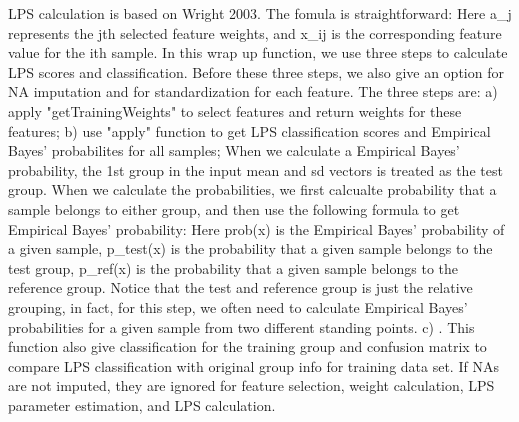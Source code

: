 \documentclass[letterpaper]{book}
\begin{document}
%
\begin{Details}\relax
LPS calculation is based on Wright 2003. The fomula is straightforward:
Here a\_j represents the jth selected feature weights, and x\_ij is the corresponding feature value 
for the ith sample.
In this wrap up function, we use three steps to calculate LPS scores and classification. 
Before these three steps, we also give an option for NA imputation and for standardization for each feature. 
The three steps are:
a) apply "getTrainingWeights" to select features and return weights for these features;
b) use "apply" function to get LPS classification scores and Empirical Bayes' probabilites for all samples;
When we calculate a Empirical Bayes' probability, the 1st group in the input mean and sd vectors is treated 
as the test group. When we calculate the probabilities, we first calcualte probability that a sample belongs
to either group, and then use the following formula to get Empirical Bayes' probability:
Here prob(x) is the Empirical Bayes' probability of a given sample, p\_test(x) is the probability 
that a given sample belongs to the test group, p\_ref(x) is the probability that a given sample 
belongs to the reference group.
Notice that the test and reference group is just the relative grouping, in fact, for this step, 
we often need to calculate Empirical Bayes' probabilities for a given sample from two different standing points.
c) . This function also give classification for the training group and confusion matrix to compare 
LPS classification with original group info for training data set.
If NAs are not imputed, they are ignored for feature selection, weight calculation, LPS parameter estimation, 
and LPS calculation.
\end{Details}
%
\end{document}
